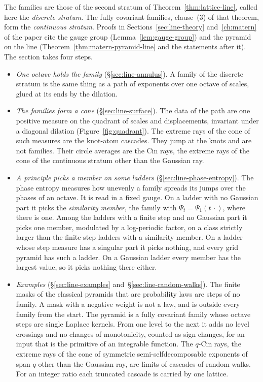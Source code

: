 The families are those of the second stratum of Theorem~\ref{thm:lattice-line}, called here the
\emph{discrete stratum}. The fully covariant families, clause~(3) of that theorem, form the
\emph{continuous stratum}. Proofs in Sections~\ref{sec:line-theory} and~\ref{ch:matern} of the paper
cite the gauge group (Lemma~\ref{lem:gauge-group}) and the \Matern{} pyramid on the line
(Theorem~\ref{thm:matern-pyramid-line} and the statements after it). The section takes four steps.
\begin{itemize}
\item \emph{One octave holds the family} (\S\ref{sec:line-annulus}). A family of the discrete
stratum is the same thing as a path of exponents over one octave of scales, glued at its ends by
the dilation.
\item \emph{The families form a cone} (\S\ref{sec:line-surface}). The \Levy{} data of the path are
one positive measure on the quadrant of scales and displacements, invariant under a diagonal
dilation (Figure~\ref{fig:quadrant}). The extreme rays of the cone of such measures are the knot-atom
cascades. They jump at the knots and are not families. Their circle averages are the Cin rays, the
extreme rays of the cone of the continuous stratum other than the Gaussian ray.
\item \emph{A principle picks a member on some ladders} (\S\ref{sec:line-phase-entropy}). The phase
entropy measures how unevenly a family spreads its jumps over the phases of an octave. It is read
in a fixed gauge. On a ladder
with no Gaussian part it picks the \emph{similarity member}, the family with
$\Psi_t = \Psi_1(t\,\cdot)$, where there is one. Among the ladders with a finite step and no
Gaussian part it picks one member, modulated by a log-periodic factor, on a class strictly larger
than the finite-step ladders with a similarity member. On a ladder whose step measure has a singular part it picks
nothing, and every grid pyramid has such a ladder. On a Gaussian ladder every member has the
largest value, so it picks nothing there either.
\item \emph{Examples} (\S\ref{sec:line-examples} and~\S\ref{sec:line-random-walks}). The finite
masks of the classical pyramids that are probability laws are steps of no family. A mask with a
negative weight is not a law, and is outside every family from the start. The \Matern{} pyramid is a fully covariant
family whose octave steps are single Laplace kernels. From one level to the next it adds no level
crossings and no changes of monotonicity, counted as sign changes, for an input that is the
primitive of an integrable function. The $q$-Cin rays, the extreme rays of the cone of symmetric semi-selfdecomposable
exponents of span $q$ other than the Gaussian ray, are limits of cascades of random walks. For an
integer ratio each truncated cascade is carried by one lattice.
\end{itemize}

